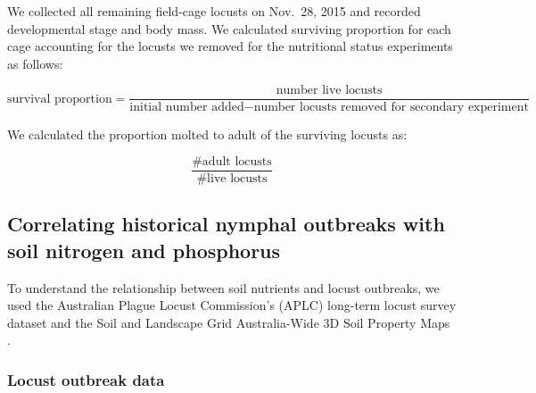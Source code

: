 \documentclass[
]{article}
\begin{document}
We collected all remaining field-cage locusts on Nov.~28, 2015 and
recorded developmental stage and body mass. We calculated surviving
proportion for each cage accounting for the locusts we removed for the
nutritional status experiments as follows:

\[
\text{survival proportion} = \frac{\text{number live locusts}}{\text{initial number added} - \text{number locusts removed for secondary experiment}}
\]

We calculated the proportion molted to adult of the surviving locusts
as:

\[
\frac{\text{\# adult locusts}}{\text{\# live locusts}}
\]

\subsection{Correlating historical nymphal outbreaks with soil nitrogen
and
phosphorus}\label{correlating-historical-nymphal-outbreaks-with-soil-nitrogen-and-phosphorus}

To understand the relationship between soil nutrients and locust
outbreaks, we used the Australian Plague Locust Commission's (APLC)
long-term locust survey dataset \citep{deveson_operation_2002} and the
Soil and Landscape Grid Australia-Wide 3D Soil Property Maps
\citep{grundy_soil_2015}.

\subsubsection{Locust outbreak data}\label{locust-outbreak-data}
\end{document}

